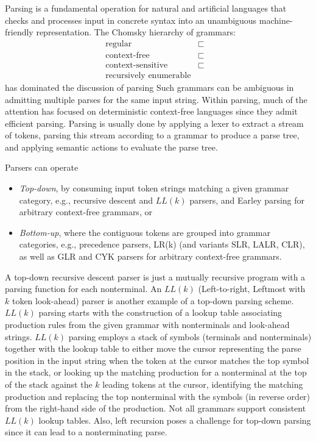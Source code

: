 \documentclass[sigplan,10pt,anonymous,review]{acmart}\settopmatter{printfolios=true,printccs=false,printacmref=false}
\begin{document}
\begin{CCSXML}
 Parsing is a fundamental operation for natural and artificial
 languages that checks and processes input in concrete syntax into an
 unambiguous machine-friendly representation. 
 The Chomsky hierarchy of grammars:
 \begin{eqnarray*}
\text{regular} &\sqsubset  &\\
 		\text{context-free} &\sqsubset  &\\
 		\text{context-sensitive} &\sqsubset &\\
 		\text{recursively enumerable}
 \end{eqnarray*}
 has dominated the discussion of parsing
 Such grammars can be ambiguous in admitting multiple parses for the
 same input string.
Within parsing, much of the attention has focused
on deterministic context-free languages since they admit efficient
parsing. Parsing is usually done by
 applying a lexer to extract a stream
  of tokens,
  parsing this stream according to a grammar to produce a
  parse tree, and
 applying semantic actions to evaluate the parse tree.


 Parsers can operate
 \begin{itemize}
 \item \emph{Top-down}, by consuming input token strings
    matching a given grammar category, e.g., recursive descent and
    $LL(k)$ parsers, and Earley parsing for arbitrary context-free grammars,
    or 
 \item \emph{Bottom-up}, where the
   contiguous tokens are grouped into grammar categories, e.g.,
   precedence parsers, LR(k) (and variants SLR,
 LALR, CLR), as well as GLR and CYK parsers for arbitrary context-free
 grammars. 
 \end{itemize}

A top-down recursive descent parser is just a mutually recursive program with a
parsing function for each nonterminal.  An $LL(k)$ (Left-to-right,
Leftmost with $k$ token look-ahead) parser is another example of a
top-down parsing scheme.  $LL(k)$ parsing starts with the construction
of a lookup table associating production rules from the given grammar
with nonterminals and look-ahead strings.  $LL(k)$ parsing employs a stack of symbols
(terminals and nonterminals) together with the lookup table to either
move the cursor representing the parse position in the input string
when the token at the cursor matches the top symbol in the stack, or
looking up the matching production for a nonterminal at the top of the
stack against the $k$ leading tokens at the cursor, identifying the
matching production and replacing the top nonterminal with the symbols
(in reverse order) from the right-hand side of the production.  Not
all grammars support consistent $LL(k)$ lookup tables.  Also, left
recursion poses a challenge for top-down parsing since it can lead to a nonterminating parse.


\end{CCSXML}
\end{document}
